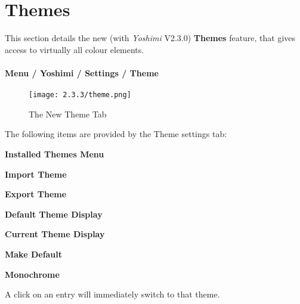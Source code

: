 %
%
%

\section{Themes}
\label{sec:themes}

   This section details the new (with \textsl{Yoshimi} V2.3.0) \textbf{Themes}
   feature, that gives access to virtually all colour elements.

\paragraph{Menu / Yoshimi / Settings / Theme}
\label{paragraph:menu_yoshimi_settings_themes}

\begin{figure}[H]
   \centering
   \texttt{[image: 2.3.3/theme.png]}
   \caption[Theme Options]{The New Theme Tab}
   \label{fig:yoshimi_settings_themes}
\end{figure}

   The following items are provided by the Theme settings tab:

   \begin{enumber}
      \item \textbf{Installed Themes Menu}
      \item \textbf{Import Theme}
      \item \textbf{Export Theme}
      \item \textbf{Default Theme Display}
      \item \textbf{Current Theme Display}
      \item \textbf{Make Default}
      \item \textbf{Monochrome}
   \end{enumber}

   \setcounter{ItemCounter}{0}      %

    {}A click on an entry will immediately switch
   to that theme.

